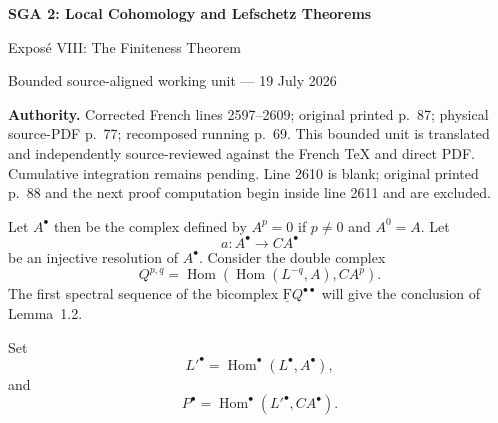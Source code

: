 \documentclass[10pt,a4paper]{article}
\newcommand{\cF}{\underline{\mathrm F}}
\begin{document}
\begin{center}
  {\Large\bfseries SGA 2: Local Cohomology and Lefschetz Theorems}\par\smallskip
  {\large Expos\'e VIII: The Finiteness Theorem}\par
  \small Bounded source-aligned working unit --- 19 July 2026
\end{center}
\noindent\colorbox{softgray}{\parbox{0.95\linewidth}{\footnotesize\textbf{Authority.}
Corrected French lines 2597--2609; original printed p.~87; physical
source-PDF p.~77; recomposed running p.~69. This bounded unit is translated
and independently source-reviewed against the French TeX and direct PDF.
Cumulative integration remains pending. Line 2610 is blank; original printed
p.~88 and the next proof computation begin inside line 2611 and are excluded.}}

Let $A^\bullet$ then be the complex defined by $A^p=0$ if $p\ne 0$ and
$A^0=A$. Let
\[
  a\colon A^\bullet\longrightarrow CA^\bullet
\]
be an injective resolution of $A^\bullet$. Consider the double complex
\begin{equation}\label{eq:VIII.1.2}
  Q^{p,q}=\operatorname{Hom}(\operatorname{Hom}(L^{-q},A),CA^p).
\end{equation}
The first spectral sequence of the bicomplex $\cF Q^{\bullet\bullet}$ will
give the conclusion of Lemma~1.2.

Set
\begin{equation}\label{eq:VIII.1.3}
  {L'}^\bullet=\operatorname{Hom}^\bullet(L^\bullet,A^\bullet),
\end{equation}
and
\begin{equation}\label{eq:VIII.1.4}
  P^\bullet=\operatorname{Hom}^\bullet({L'}^\bullet,CA^\bullet).
\end{equation}
\end{document}
